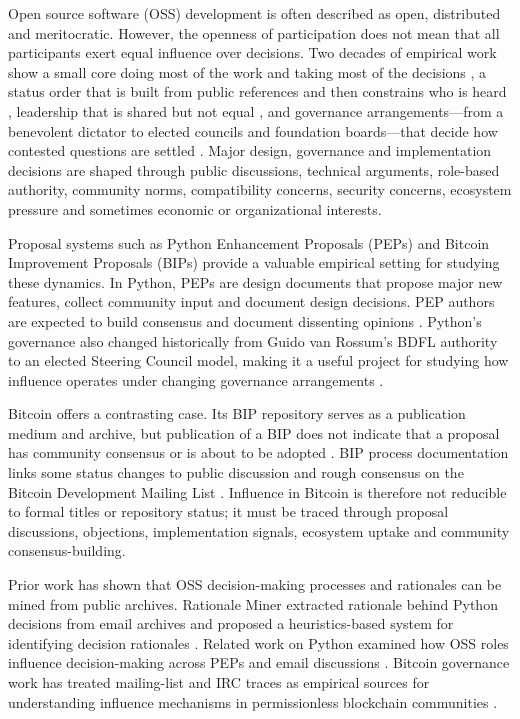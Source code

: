 \documentclass[sigconf,screen]{acmart}
\begin{document}
Open source software (OSS) development is often described as open, distributed and meritocratic. However, the openness of participation does not mean that all participants exert equal influence over decisions. Two decades of empirical work show a small core doing most of the work and taking most of the decisions \cite{mockus2002, crowston2005}, a status order that is built from public references and then constrains who is heard \cite{stewart2005}, leadership that is shared but not equal \cite{fielding1999, dahlander2011}, and governance arrangements---from a benevolent dictator to elected councils and foundation boards---that decide how contested questions are settled \cite{omahony2007, markus2007, shah2006, weber2004}. Major design, governance and implementation decisions are shaped through public discussions, technical arguments, role-based authority, community norms, compatibility concerns, security concerns, ecosystem pressure and sometimes economic or organizational interests.

Proposal systems such as Python Enhancement Proposals (PEPs) and Bitcoin Improvement Proposals (BIPs) provide a valuable empirical setting for studying these dynamics. In Python, PEPs are design documents that propose major new features, collect community input and document design decisions. PEP authors are expected to build consensus and document dissenting opinions \cite{pep1}. Python's governance also changed historically from Guido van Rossum's BDFL authority to an elected Steering Council model, making it a useful project for studying how influence operates under changing governance arrangements \cite{pep13}.

Bitcoin offers a contrasting case. Its BIP repository serves as a publication medium and archive, but publication of a BIP does not indicate that a proposal has community consensus or is about to be adopted \cite{bitcoinbips}. BIP process documentation links some status changes to public discussion and rough consensus on the Bitcoin Development Mailing List \cite{bip3}. Influence in Bitcoin is therefore not reducible to formal titles or repository status; it must be traced through proposal discussions, objections, implementation signals, ecosystem uptake and community consensus-building.

Prior work has shown that OSS decision-making processes and rationales can be mined from public archives. Rationale Miner extracted rationale behind Python decisions from email archives and proposed a heuristics-based system for identifying decision rationales \cite{sharma2021rationale,sharma2024rationale}. Related work on Python examined how OSS roles influence decision-making across PEPs and email discussions \cite{sharma2021roles}. Bitcoin governance work has treated mailing-list and IRC traces as empirical sources for understanding influence mechanisms in permissionless blockchain communities \cite{thapa2021bitcoin}.
\end{document}
